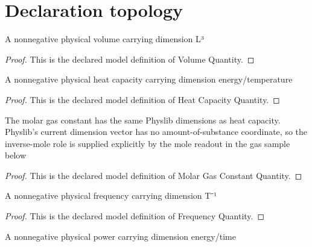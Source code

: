 \section{Declaration topology}
\begin{definition}
  \label{def:physics:phyx-mini-0438:phyxminiproblems-problemphyxmini0438-volumequantity}
  A nonnegative physical volume carrying dimension L³
\end{definition}
\begin{proof}
  This is the declared model definition of Volume Quantity.
\end{proof}
\begin{definition}
  \label{def:physics:phyx-mini-0438:phyxminiproblems-problemphyxmini0438-heatcapacityquantity}
  A nonnegative physical heat capacity carrying dimension energy/temperature
\end{definition}
\begin{proof}
  This is the declared model definition of Heat Capacity Quantity.
\end{proof}
\begin{definition}
  \label{def:physics:phyx-mini-0438:phyxminiproblems-problemphyxmini0438-molargasconstantquantity}
  The molar gas constant has the same Physlib dimensions as heat capacity. Physlib's current dimension vector has no amount-of-substance coordinate, so the inverse-mole role is supplied explicitly by the mole readout in the gas sample below
\end{definition}
\begin{proof}
  This is the declared model definition of Molar Gas Constant Quantity.
\end{proof}
\begin{definition}
  \label{def:physics:phyx-mini-0438:phyxminiproblems-problemphyxmini0438-frequencyquantity}
  A nonnegative physical frequency carrying dimension T⁻¹
\end{definition}
\begin{proof}
  This is the declared model definition of Frequency Quantity.
\end{proof}
\begin{definition}
  \label{def:physics:phyx-mini-0438:phyxminiproblems-problemphyxmini0438-powerquantity}
  A nonnegative physical power carrying dimension energy/time
\end{definition}
